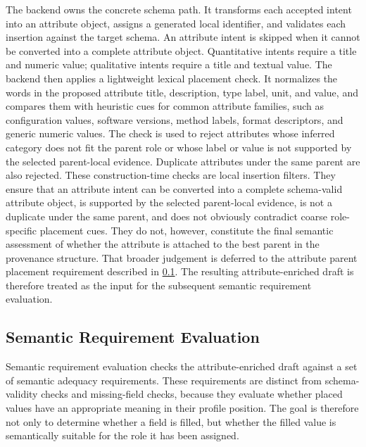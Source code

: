 The backend owns the concrete schema path.
It transforms each accepted intent into an attribute object, assigns a generated local identifier, and validates each insertion against the target schema.
An attribute intent is skipped when it cannot be converted into a complete attribute object.
Quantitative intents require a title and numeric value; qualitative intents require a title and textual value.
The backend then applies a lightweight lexical placement check.
It normalizes the words in the proposed attribute title, description, type label, unit, and value, and compares them with heuristic cues for common attribute families, such as configuration values, software versions, method labels, format descriptors, and generic numeric values.
The check is used to reject attributes whose inferred category does not fit the parent role or whose label or value is not supported by the selected parent-local evidence.
Duplicate attributes under the same parent are also rejected.
These construction-time checks are local insertion filters.
They ensure that an attribute intent can be converted into a complete schema-valid attribute object, is supported by the selected parent-local evidence, is not a duplicate under the same parent, and does not obviously contradict coarse role-specific placement cues.
They do not, however, constitute the final semantic assessment of whether the attribute is attached to the best parent in the provenance structure.
That broader judgement is deferred to the attribute parent placement requirement described in \cref{sec:semantic_requirement_evaluation}.
The resulting attribute-enriched draft is therefore treated as the input for the subsequent semantic requirement evaluation.

\subsection{Semantic Requirement Evaluation}
\label{sec:semantic_requirement_evaluation}

Semantic requirement evaluation checks the attribute-enriched draft against a set of semantic adequacy requirements.
These requirements are distinct from schema-validity checks and missing-field checks, because they evaluate whether placed values have an appropriate meaning in their profile position.
The goal is therefore not only to determine whether a field is filled, but whether the filled value is semantically suitable for the role it has been assigned.

